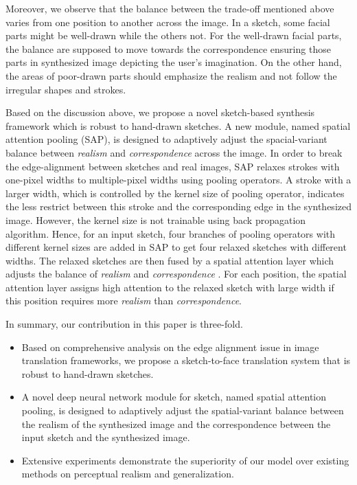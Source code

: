 Moreover, we observe that the balance between the trade-off mentioned above varies from one position to another across the image. In a sketch, some facial parts might be well-drawn while the others not. For the well-drawn facial parts, the balance are supposed to move towards the correspondence ensuring those parts in synthesized image depicting the user's imagination. On the other hand, the areas of poor-drawn parts should emphasize the realism and not follow the irregular shapes and strokes.

Based on the discussion above, we propose a novel sketch-based synthesis framework which is robust to hand-drawn sketches. A new module, named spatial attention pooling (SAP), is designed to adaptively adjust the spacial-variant balance between \textit{realism} and \textit{correspondence} across the image. In order to break the edge-alignment between sketches and real images, SAP relaxes strokes with one-pixel widths to multiple-pixel widths using pooling operators. A stroke with a larger width, which is controlled by the kernel size of pooling operator, indicates the less restrict between this stroke and the corresponding edge in the synthesized image. However, the kernel size is not trainable using back propagation algorithm. Hence, for an input sketch, four branches of pooling operators with different kernel sizes are added in SAP to get four relaxed sketches with different widths. The relaxed sketches are then fused by a spatial attention layer which adjusts the balance of \textit{realism} and \textit{correspondence} . For each position, the spatial attention layer assigns high attention to the relaxed sketch with large width if this position requires more \textit{realism} than \textit{correspondence}. 

In summary, our contribution in this paper is three-fold.
\begin{itemize}
	\item Based on comprehensive analysis on the edge alignment issue in image translation frameworks, we propose a sketch-to-face translation system that is robust to hand-drawn sketches. 
	\item A novel deep neural network module for sketch, named spatial attention pooling, is designed to adaptively adjust the spatial-variant balance between the realism of the synthesized image and the correspondence between the input sketch and the synthesized image.
	\item Extensive experiments demonstrate the superiority of our model over existing methods on perceptual realism and generalization.
\end{itemize}
